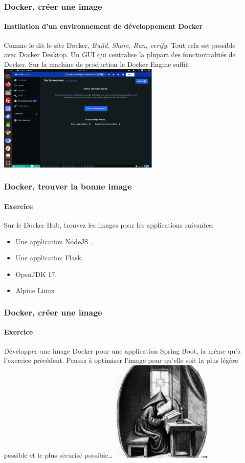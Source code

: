 \documentclass{beamer}
\begin{document}
    \begin{frame}
        \transdissolve
        \frametitle{Docker, créer une image}
        \framesubtitle{Instllation d'un environnement de développement Docker}
        Comme le dit le site Docker, \textit{Build, Share, Run, verify}.
        Tout cela est possible avec Docker Desktop.
        Un GUI qui centralise la plupart des fonctionnalités de Docker.
        \bigbreak
        Sur la machine de production le Docker Engine suffit.
        \bigbreak
        \centering
        \includegraphics[width=8cm]{image/docker-desktop}
    \end{frame}

    \begin{frame}
        \transdissolve
        \frametitle{Docker, trouver la bonne image}
        \framesubtitle{Exercice \execcounterdispinc{}}
        Sur le Docker Hub, trouvez les images pour les applications suivantes:
        \begin{itemize}
            \item Une application NodeJS~.
            \item Une application Flask.
            \item OpenJDK 17.
            \item Alpine Linux
        \end{itemize}
    \end{frame}

    \begin{frame}
        \transdissolve
        \frametitle{Docker, créer une image}
        \framesubtitle{Exercice \execcounterdispinc{}}
        Développer une image Docker pour une application Spring Boot, la même qu'à l'exercice précédent.
        \bigbreak
        Pensez à optimiser l'image pour qu'elle soit la plus légère possible et le plus sécurisé possible\ldots
        \bigbreak
        \centering
        \includegraphics[width=5cm]{image/young-studying}
    \end{frame}
\end{document}
